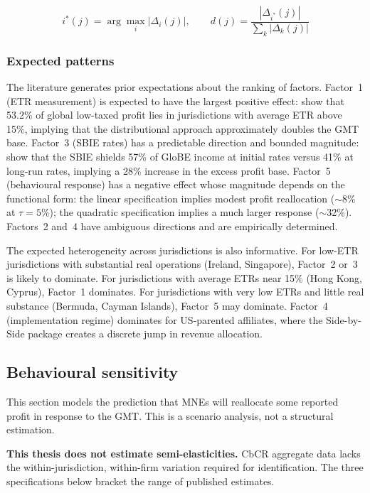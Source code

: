\documentclass[11pt,a4paper]{article}
\begin{document}
\begin{equation}\label{eq:dominant_factor}
i^*(j) = \arg\max_i \left|\Delta_i(j)\right|, \qquad d(j) = \frac{|\Delta_{i^*}(j)|}{\sum_k |\Delta_k(j)|}
\end{equation}

\subsubsection{Expected patterns}\label{sec:expected_patterns}

The literature generates prior expectations about the ranking of factors. Factor~1 (ETR measurement) is expected to have the largest positive effect: \citet{hugger2026} show that 53.2\% of global low-taxed profit lies in jurisdictions with average ETR above 15\%, implying that the distributional approach approximately doubles the GMT base. Factor~3 (SBIE rates) has a predictable direction and bounded magnitude: \citet{devereux2023} show that the SBIE shields 57\% of GloBE income at initial rates versus 41\% at long-run rates, implying a 28\% increase in the excess profit base. Factor~5 (behavioural response) has a negative effect whose magnitude depends on the functional form: the linear specification implies modest profit reallocation ($\sim$8\% at $\tau = 5\%$); the quadratic specification implies a much larger response ($\sim$32\%). Factors~2 and~4 have ambiguous directions and are empirically determined.

The expected heterogeneity across jurisdictions is also informative. For low-ETR jurisdictions with substantial real operations (Ireland, Singapore), Factor~2 or~3 is likely to dominate. For jurisdictions with average ETRs near 15\% (Hong Kong, Cyprus), Factor~1 dominates. For jurisdictions with very low ETRs and little real substance (Bermuda, Cayman Islands), Factor~5 may dominate. Factor~4 (implementation regime) dominates for US-parented affiliates, where the Side-by-Side package creates a discrete jump in revenue allocation.


\subsection{Behavioural sensitivity}\label{sec:behavioural}


This section models the prediction that MNEs will reallocate some reported profit in response to the GMT. This is a scenario analysis, not a structural estimation.

\textbf{This thesis does not estimate semi-elasticities.} CbCR aggregate data lacks the within-jurisdiction, within-firm variation required for identification. The three specifications below bracket the range of published estimates.
\end{document}
